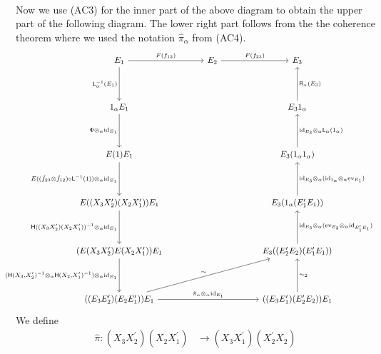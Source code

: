 \begin{prf}
\begin{enumerate}
\begin{equation*}
\begin{tikzcd}[row sep=3.2em,column sep=6em]
\end{tikzcd}
\end{equation*}
Now we use (AC3) for the inner part of the above diagram to obtain the upper part of the following diagram. The lower right part follows from the the coherence theorem where we used the notation $\hat{\pi}_{\alpha}$ from (AC4).
\begin{equation*}
\hspace{-1.5em}
\begin{tikzcd}[row sep=4em,column sep=4.5em]
  E_{1}
  \ar{r}{F(f_{12})}
  \ar{d}[swap]{\mathsf{L}_{\alpha}^{-1}(E_{1})}
  &
  E_{2}
  \ar{r}{F(f_{23})}
  &
  E_{3}
  \\
  1_{\alpha} E_{1}
  \ar{d}[swap]{\Phi \otimes_{\alpha} \mathrm{id}_{E_{1}}}
  &
  &
  E_{3} 1_{\alpha}
  \ar{u}[swap]{\mathsf{R}_{\alpha}(E_{3})}
  \\
  E(1) E_{1}
  \ar{d}[swap]{E((\tilde{f}_{23} \otimes \tilde{f}_{12}) \circ \mathsf{L}^{-1}(1)) \otimes_{\alpha} \mathrm{id}_{E_{1}}}
  &
  &
  E_{3} (1_{\alpha} 1_{\alpha})
  \ar{u}[swap]{\mathrm{id}_{E_{3}} \otimes_{\alpha} \mathsf{L}_{\alpha}(1_{\alpha})}
  \\
  E((X_{3} X_{2}^{\prime}) (X_{2} X_{1}^{\prime})) E_{1}
  \ar{d}[swap]{\mathsf{H}((X_{3} X_{2}^{\prime})(X_{2} X_{1}^{\prime}))^{-1} \otimes_{\alpha} \mathrm{id}_{E_{1}}}
  &
  &
  E_{3} (1_{\alpha} (E_{1}^{\prime} E_{1}))
  \ar{u}[swap]{\mathrm{id}_{E_{3}} \otimes_{\alpha} (\mathrm{id}_{1_{\alpha}} \otimes_{\alpha} \mathrm{ev}_{E_{1}})}
  \\
  (E(X_{3} X_{2}^{\prime}) E(X_{2} X_{1}^{\prime})) E_{1}
  \ar{d}[swap]{(\mathsf{H}(X_{3},X_{2}^{\prime})^{-1} \otimes_{\alpha} \mathsf{H}(X_{2},X_{1}^{\prime})^{-1}) \otimes_{\alpha} \mathrm{id}_{E_{1}}}
  &
  &
  E_{3} ((E_{2}^{\prime} E_{2}) (E_{1}^{\prime} E_{1}))
  \ar{u}[swap]{\mathrm{id}_{E_{3}} \otimes_{\alpha} (\mathrm{ev}_{E_{2}} \otimes_{\alpha} \mathrm{id}_{E_{1}^{\prime} E_{1}})}
  \\
  ((E_{3} E_{2}^{\prime}) (E_{2} E_{1}^{\prime})) E_{1}
  \ar{urr}{\sim}
  \ar{rr}{\hat{\pi}_{\alpha} \otimes_{\alpha} \mathrm{id}_{E_{1}}}
  &
  &
  ((E_{3} E_{1}^{\prime}) (E_{2}^{\prime} E_{2})) E_{1}
  \ar{u}[swap]{\sim_{2}}
\end{tikzcd}
\end{equation*}
We define
\begin{align*}
  \hat{\pi}
  \colon
  (X_{3} X_{2}^{\prime}) (X_{2} X_{1}^{\prime})
  &\to
  (X_{3} X_{1}^{\prime}) (X_{2}^{\prime} X_{2})
\end{align*}

\end{enumerate}
\end{prf}
